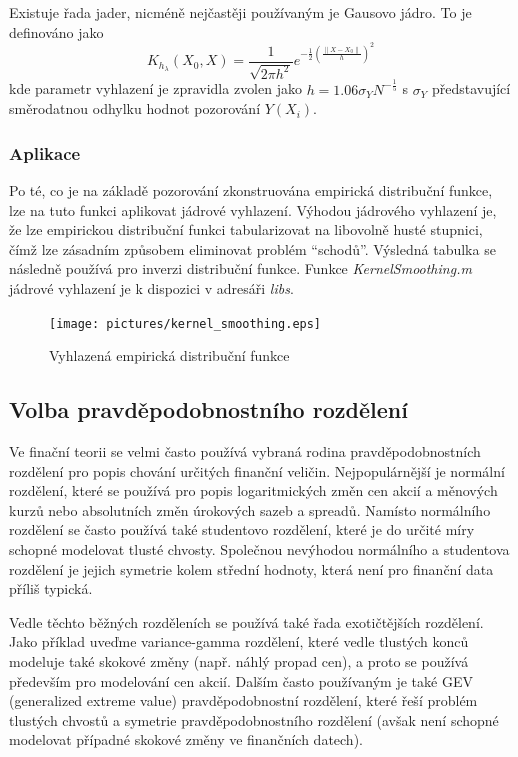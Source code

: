 Existuje řada jader, nicméně nejčastěji používaným je Gausovo jádro. To je definováno jako
\begin{equation*}
K_{h_{\lambda}}(X_0, X) = \frac{1}{\sqrt{2 \pi h^2}} e^{-\frac{1}{2}\left(\frac{\parallel X - X_0\parallel}{h}\right)^2}
\end{equation*}
kde parametr vyhlazení je zpravidla zvolen jako $h = 1.06 \sigma_Y N ^{-\frac{1}{5}}$ s $\sigma_Y$ představující směrodatnou odhylku hodnot pozorování $Y(X_i)$. 

\subsubsection{Aplikace}

Po té, co je na základě pozorování zkonstruována empirická distribuční funkce, lze na tuto funkci aplikovat jádrové vyhlazení. Výhodou jádrového vyhlazení je, že lze empirickou distribuční funkci tabularizovat na libovolně husté stupnici, čímž lze zásadním způsobem eliminovat problém ``schodů''. Výsledná tabulka se následně používá pro inverzi distribuční funkce. Funkce \textit{KernelSmoothing.m} jádrové vyhlazení je k dispozici v adresáři \textit{libs}. 

\begin{figure}[htp]
\centering
\texttt{[image: pictures/kernel\_smoothing.eps]}
\caption{Vyhlazená empirická distribuční funkce}
\end{figure}

\subsection{Volba pravděpodobnostního rozdělení}

Ve finační teorii se velmi často používá vybraná rodina pravděpodobnostních rozdělení pro popis chování určitých finanční veličin. Nejpopulárnější je normální rozdělení, které se používá pro popis logaritmických změn cen akcií a měnových kurzů nebo absolutních změn úrokových sazeb a spreadů. Namísto normálního rozdělení se často používá také studentovo rozdělení, které je do určité míry schopné modelovat tlusté chvosty. Společnou nevýhodou normálního a studentova rozdělení je jejich symetrie kolem střední hodnoty, která není pro finanční data příliš typická.

Vedle těchto běžných rozděleních se používá také řada exotičtějších rozdělení. Jako příklad uveďme variance-gamma rozdělení, které vedle tlustých konců modeluje také skokové změny (např. náhlý propad cen), a proto se používá především pro modelování cen akcií. Dalším často používaným je také GEV (generalized extreme value) pravděpodobnostní rozdělení, které řeší problém tlustých chvostů a symetrie pravděpodobnostního rozdělení (avšak není schopné modelovat případné skokové změny ve finančních datech).

